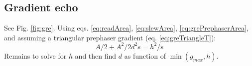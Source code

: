 \documentclass{article}
\begin{document}
\subsection{Gradient echo}
See Fig. \ref{fig:gre}. 
Using eqs. \ref{eq:readArea}, \ref{eq:slewArea}, \ref{eq:grePrephaserArea}, and assuming a triangular prephaser gradient (eq. \ref{eq:greTriangleT}):
\begin{equation}
    A/2 + A^2/{2d^2 s} = h^2/s
\end{equation}
Remains to solve for $h$ and then find $d$ as function of $\min(g_{max}, h)$.
\end{document}
